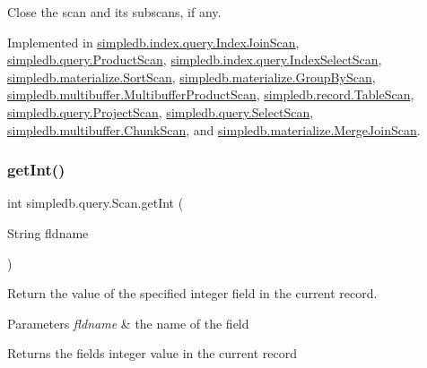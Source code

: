 Close the scan and its subscans, if any. 

Implemented in \hyperlink{classsimpledb_1_1index_1_1query_1_1IndexJoinScan_a2746415c838f22a234167417f8c538b6}{simpledb.\+index.\+query.\+Index\+Join\+Scan}, \hyperlink{classsimpledb_1_1query_1_1ProductScan_a58ee47fd6a8b397c3ad386fd7f3d257e}{simpledb.\+query.\+Product\+Scan}, \hyperlink{classsimpledb_1_1index_1_1query_1_1IndexSelectScan_a5dab2095d3e3d77a6db1f8ad849dc8ad}{simpledb.\+index.\+query.\+Index\+Select\+Scan}, \hyperlink{classsimpledb_1_1materialize_1_1SortScan_abbd920a65ae5509e705112fe6cfbb966}{simpledb.\+materialize.\+Sort\+Scan}, \hyperlink{classsimpledb_1_1materialize_1_1GroupByScan_a95a307d14faf60c967efaaa666d22bf0}{simpledb.\+materialize.\+Group\+By\+Scan}, \hyperlink{classsimpledb_1_1multibuffer_1_1MultibufferProductScan_a20a1d9952bcac4f243d591b56cefaad2}{simpledb.\+multibuffer.\+Multibuffer\+Product\+Scan}, \hyperlink{classsimpledb_1_1record_1_1TableScan_aff0239675c54b7e5d7c72695a7169c7c}{simpledb.\+record.\+Table\+Scan}, \hyperlink{classsimpledb_1_1query_1_1ProjectScan_a192669ae4807d1f623fe6200fe37522f}{simpledb.\+query.\+Project\+Scan}, \hyperlink{classsimpledb_1_1query_1_1SelectScan_a5baa8036fe4b4ab88760ce5cad67e7ec}{simpledb.\+query.\+Select\+Scan}, \hyperlink{classsimpledb_1_1multibuffer_1_1ChunkScan_ac05118042ff2f71f455a3fc4cd5288d0}{simpledb.\+multibuffer.\+Chunk\+Scan}, and \hyperlink{classsimpledb_1_1materialize_1_1MergeJoinScan_a11fc3e14ebf559089454871786acf1fe}{simpledb.\+materialize.\+Merge\+Join\+Scan}.

\mbox{\label{interfacesimpledb_1_1query_1_1Scan_a2e064555e16240115167b5d42d2b3d19}} 
\subsubsection{\texorpdfstring{get\+Int()}{getInt()}}
{\footnotesize\ttfamily int simpledb.\+query.\+Scan.\+get\+Int (\begin{DoxyParamCaption}\item[{String}]{fldname }\end{DoxyParamCaption})}

Return the value of the specified integer field in the current record. 
\begin{DoxyParams}{Parameters}
{\em fldname} & the name of the field \\
\hline
\end{DoxyParams}
\begin{DoxyReturn}{Returns}
the field\textquotesingle{}s integer value in the current record 
\end{DoxyReturn}


